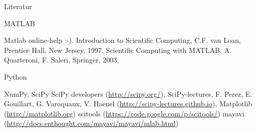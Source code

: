 \documentclass[hyperref={xetex}]{beamer}
\begin{document}
\begin{frame}[fragile]{Literatur}
  \begin{block}{MATLAB}
  \begin{thebibliography}{10}
\small
{} \alert{Matlab online-help :-)}.
 \alert{Introduction to Scientific Computing}, C.F. van Loan, Prentice Hall,
New Jersey, 1997,
 \alert{Scientific Computing with MATLAB}, A. Quarteroni, F. Saleri, Springer, 2003,
\end{thebibliography}
\end{block}
\begin{block}{Python}
  \begin{thebibliography}{10}
      \small
     \alert{NumPy, SciPy} SciPy developers (\url{http://scipy.org/}),
     \alert{SciPy-lectures}, F. Perez, E. Gouillart, G. Varoquaux, V. Haenel (\url{http://scipy-lectures.github.io}),
     \alert{Matplotlib} (\url{http://matplotlib.org})
     \alert{scitools} (\url{https://code.google.com/p/scitools/}) 
     \alert{mayavi} (\url{http://docs.enthought.com/mayavi/mayavi/mlab.html})
  \end{thebibliography}
\end{block}
\end{frame}
\end{document}
